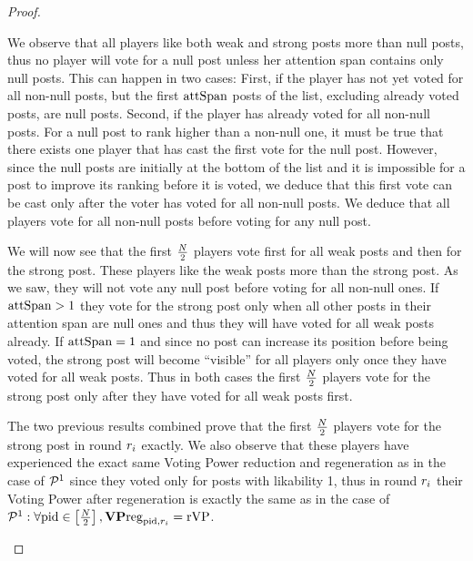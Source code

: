 \documentclass[a4paper,english,cleveref, autoref]{oasics-v2019}
\begin{document}
\begin{subappendices}
\begin{proof}
\begin{itemize}
    We observe that all players like both weak and strong posts more than null
    posts, thus no player will vote for a null post unless her attention span
    contains only null posts. This can happen in two cases: First, if the player
    has not yet voted for all non-null posts, but the first $\mathrm{attSpan}$ posts of
    the list, excluding already voted posts, are null posts. Second, if the
    player has already voted for all non-null posts. For a null post to rank
    higher than a non-null one, it must be true that there exists one player
    that has cast the first vote for the null post. However, since the null
    posts are initially at the bottom of the list and it is impossible for a
    post to improve its ranking before it is voted, we deduce that this first
    vote can be cast only after the voter has voted for all non-null posts. We
    deduce that all players vote for all non-null posts before voting for any
    null post.

    We will now see that the first $\frac{N}{2}$ players vote first for
    all weak posts and then for the strong post. These players like the weak
    posts more than the strong post. As we saw, they will not vote any null
    post before voting for all non-null ones. If $\mathrm{attSpan} > 1$ they vote for
    the strong post only when all other posts in their attention span are null
    ones and thus they will have voted for all weak posts already. If $\mathrm{attSpan}
    = 1$ and since no post can increase its position before being voted, the
    strong post will become ``visible'' for all players only once they have
    voted for all weak posts. Thus in both cases the first
    $\frac{N}{2}$ players vote for the strong post only after they have
    voted for all weak posts first.

    The two previous results combined prove that the first
    $\frac{N}{2}$ players vote for the strong post in round $r_i$
    exactly. We also observe that these players have experienced the exact same
    Voting Power reduction and regeneration as in the case of $\mathcal{P}^1$
    since they voted only for posts with likability 1, thus in round $r_i$
    their Voting Power after regeneration is exactly the same as in the case of
    $\mathcal{P}^1: \forall \mathrm{pid} \in \left[\frac{N}{2}\right],
    \mathrm{\textbf{VP}reg}_{\mathrm{pid}, r_i} = \mathrm{rVP}$.


\end{itemize}
\end{proof}
\end{subappendices}
\end{document}
